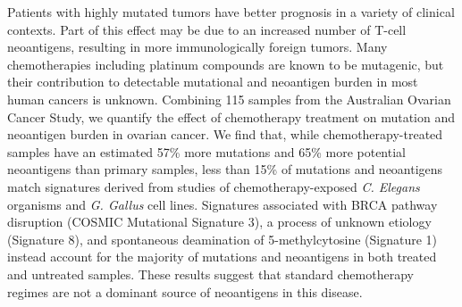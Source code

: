 Patients with highly mutated tumors have better prognosis in a variety of clinical contexts. Part of this effect may be due to an increased number of T-cell neoantigens, resulting in more immunologically foreign tumors. Many chemotherapies including platinum compounds are known to be mutagenic, but their contribution to detectable mutational and neoantigen burden in most human cancers is unknown. Combining 115 samples from the Australian Ovarian Cancer Study, we quantify the effect of chemotherapy treatment on mutation and neoantigen burden in ovarian cancer. We find that, while chemotherapy-treated samples have an estimated 57\% more mutations and 65\% more potential neoantigens than primary samples, less than 15\% of mutations and neoantigens match signatures derived from studies of chemotherapy-exposed \textit{C. Elegans} organisms and \textit{G. Gallus} cell lines. Signatures associated with BRCA pathway disruption (COSMIC Mutational Signature 3), a process of unknown etiology (Signature 8), and spontaneous deamination of 5-methylcytosine (Signature 1) instead account for the majority of mutations and neoantigens in both treated and untreated samples. These results suggest that standard chemotherapy regimes are not a dominant source of neoantigens in this disease.

